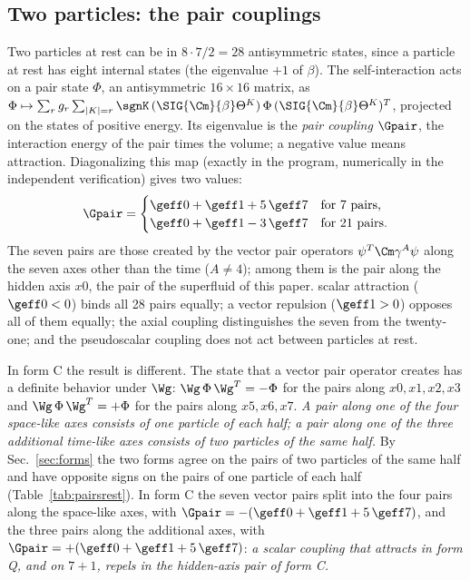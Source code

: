 \subsection{Two particles: the pair couplings}
\label{sec:pairs}

Two particles at rest can be in $8\cdot7/2=28$ antisymmetric states, since a particle at rest has
eight internal states (the eigenvalue $+1$ of $\beta$). The self-interaction acts on a pair state
$\Phi$, an antisymmetric $16\times16$ matrix, as
$\Phi\mapsto\sum_rg_r\sum_{|K|=r}\sgnK\,(\SIG{\Cm}{\beta}\Theta^{K})\,\Phi\,(\SIG{\Cm}{\beta}\Theta^{K})^{T}$,
projected on the states of positive energy. Its eigenvalue is the \emph{pair coupling} $\Gpair$,
the interaction energy of the pair times the volume; a negative value means attraction. Diagonalizing
this map (exactly in the program, numerically in the independent verification) gives two values:
\begin{equation}
\Gpair=\begin{cases}\geff0+\geff1+5\,\geff7&\text{for 7 pairs,}\\ \geff0+\geff1-3\,\geff7&\text{for 21 pairs.}\end{cases}
\label{eq:Gpair}
\end{equation}
The seven pairs are those created by the vector pair operators $\psi^{T}\Cm\gamma^{A}\psi$ along
the seven axes other than the time ($A\neq4$); among them is the pair along the hidden axis $x0$,
the pair of the superfluid of this paper.  scalar attraction ($\geff0<0$) binds all 28 pairs equally; a vector repulsion
($\geff1>0$) opposes all of them equally; the axial coupling distinguishes the seven from the
twenty-one; and the pseudoscalar coupling does not act between particles at rest.

In form C the result is different. The state that a vector pair operator creates has a definite
behavior under $\Wg$: $\Wg\,\Phi\,\Wg^{T}=-\Phi$ for the pairs along $x0,x1,x2,x3$ and
$\Wg\,\Phi\,\Wg^{T}=+\Phi$ for the pairs along $x5,x6,x7$. \emph{A pair along one of the four
space-like axes consists of one particle of each half; a pair along one of the three additional
time-like axes consists of two particles of the same half.} By Sec.~\ref{sec:forms} the two forms
agree on the pairs of two particles of the same half and have opposite signs on the pairs of one
particle of each half (Table~\ref{tab:pairsrest}). In form C the seven vector pairs split into the
four pairs along the space-like axes, with $\Gpair=-(\geff0+\geff1+5\,\geff7)$, and the three pairs
along the additional axes, with $\Gpair=+(\geff0+\geff1+5\,\geff7)$: \emph{a scalar coupling that
attracts in form Q, and on $7+1$, repels in the hidden-axis pair of form C.}

